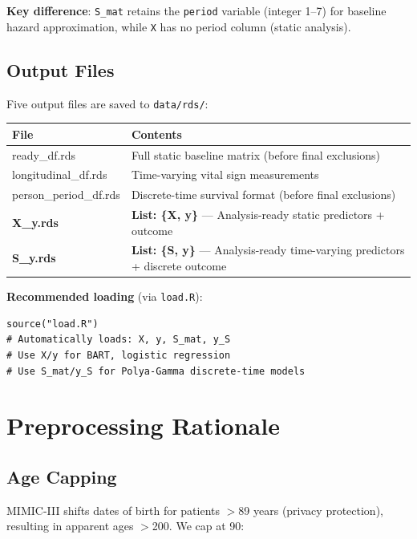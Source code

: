 \documentclass[11pt]{article}
\begin{document}
\textbf{Key difference}: \texttt{S\_mat} retains the \texttt{period} variable (integer 1--7) for baseline hazard approximation, while \texttt{X} has no period column (static analysis).

\subsection{Output Files}

Five output files are saved to \texttt{data/rds/}:

\begin{longtable}{L{4cm}L{10cm}}
\toprule
\textbf{File} & \textbf{Contents} \\
\midrule
\endhead
ready\_df.rds & Full static baseline matrix (before final exclusions) \\
longitudinal\_df.rds & Time-varying vital sign measurements \\
person\_period\_df.rds & Discrete-time survival format (before final exclusions) \\
\midrule
\textbf{X\_y.rds} & \textbf{List: \{X, y\}} --- Analysis-ready static predictors + outcome \\
\textbf{S\_y.rds} & \textbf{List: \{S, y\}} --- Analysis-ready time-varying predictors + discrete outcome \\
\bottomrule
\end{longtable}

\textbf{Recommended loading} (via \texttt{load.R}):

\begin{verbatim}
source("load.R")
# Automatically loads: X, y, S_mat, y_S
# Use X/y for BART, logistic regression
# Use S_mat/y_S for Polya-Gamma discrete-time models
\end{verbatim}

\section{Preprocessing Rationale}

\subsection{Age Capping}

MIMIC-III shifts dates of birth for patients $>$89 years (privacy protection), resulting in apparent ages $>$200. We cap at 90:
\end{document}
